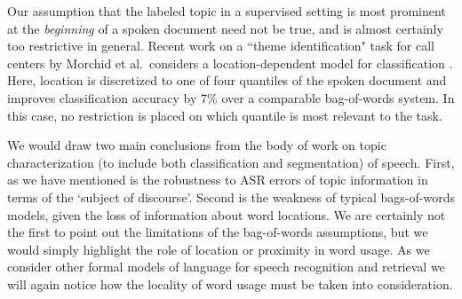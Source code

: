 Our assumption that the labeled topic in a supervised setting is most prominent at the \textit{beginning} of a spoken document need not be true, and is almost certainly too restrictive in general.   Recent work on a ``theme identification" task for call centers by Morchid et al.\ considers a location-dependent model for classification \cite{morchid2013theme}.  Here, location is discretized to one of four quantiles of the spoken document and improves classification accuracy by 7\% over a comparable bag-of-words system.  In this case, no restriction is placed on which quantile is most relevant to the task.


We would draw two main conclusions from the body of work on topic characterization (to include both classification and segmentation) of speech.  First, as we have mentioned is the robustness to ASR errors of topic information in terms of the `subject of discourse'.  Second is the weakness of typical bags-of-words models, given the loss of information about word locations. We are certainly not the first to point out the limitations of the bag-of-words assumptions, but we would simply highlight the role of location or proximity in word usage.  As we consider other formal models of language for speech recognition and retrieval we will again notice how the locality of word usage must be taken into consideration.



